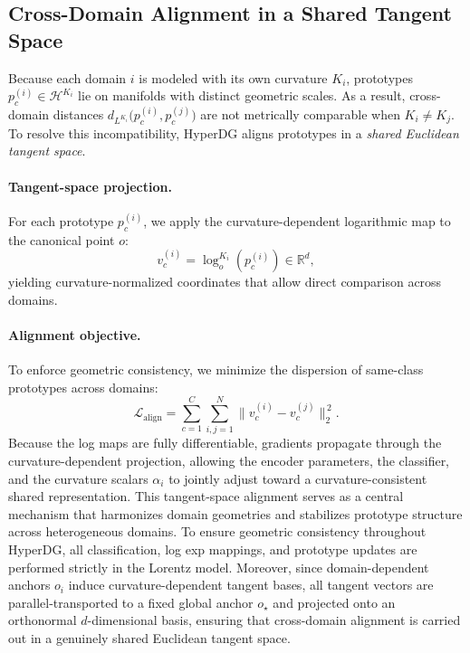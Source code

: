 \documentclass[10pt]{article} %
\begin{document}
\subsection{Cross-Domain Alignment in a Shared Tangent Space}
\label{sec:align-tangent}

Because each domain $i$ is modeled with its own curvature $K_i$, prototypes
$p_c^{(i)} \in \mathcal{H}^{K_i}$ lie on manifolds with distinct geometric
scales. As a result, cross-domain distances
$d_{L^{K_i}}\!\big(p_c^{(i)}, p_c^{(j)}\big)$ are not metrically comparable when
$K_i \neq K_j$. To resolve this incompatibility, HyperDG aligns prototypes in a
\emph{shared Euclidean tangent space}.

\paragraph{Tangent-space projection.}
For each prototype $p_c^{(i)}$, we apply the curvature-dependent logarithmic map
to the canonical point $o$:
\[
v_c^{(i)}
=
\log_{o}^{K_i}(p_c^{(i)}) \in \mathbb{R}^d,
\]
yielding curvature-normalized coordinates that allow direct comparison across
domains.

\paragraph{Alignment objective.}
To enforce geometric consistency, we minimize the dispersion of same-class
prototypes across domains:
\begin{equation}
\mathcal{L}_{\mathrm{align}}
=
\sum_{c=1}^{C}
\sum_{i,j=1}^{N}
\big\|
v_c^{(i)} - v_c^{(j)}
\big\|_2^{\,2}.
\label{eq:align-lorentz}
\end{equation}
Because the log maps are fully differentiable, gradients propagate through the
curvature-dependent projection, allowing the encoder parameters, the classifier,
and the curvature scalars $\alpha_i$ to jointly adjust toward a
curvature-consistent shared representation. This tangent-space alignment serves
as a central mechanism that harmonizes domain geometries and stabilizes
prototype structure across heterogeneous domains.
To ensure geometric consistency throughout HyperDG, all classification, 
log exp mappings, and prototype updates are performed strictly in the 
Lorentz model. Moreover, since 
domain-dependent anchors $o_i$ induce curvature-dependent tangent bases, 
all tangent vectors are parallel-transported to a fixed global anchor 
$o_\star$ and projected onto an orthonormal $d$-dimensional basis, 
ensuring that cross-domain alignment is carried out in a genuinely shared 
Euclidean tangent space.
\end{document}
